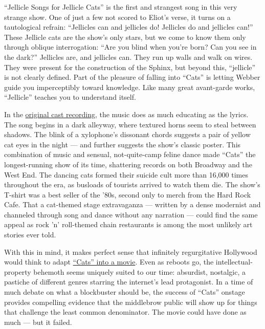 ``Jellicle Songs for Jellicle Cats'' is the first and strangest song in
this very strange show. One of just a few not scored to Eliot's verse,
it turns on a tautological refrain: ``Jellicles can and jellicles do!
Jellicles do and jellicles can!'' These Jellicle cats are the show's
only stars, but we come to know them only through oblique interrogation:
``Are you blind when you're born? Can you see in the dark?'' Jellicles
are, and jellicles can. They run up walls and walk on wires. They were
present for the construction of the Sphinx, but beyond this,
``jellicle'' is not clearly defined. Part of the pleasure of falling
into ``Cats'' is letting Webber guide you imperceptibly toward
knowledge. Like many great avant-garde works, ``Jellicle'' teaches you
to understand itself.

In the \href{https://www.youtube.com/watch?v=GbpP3Sxp-1U}{original cast
recording}, the music does as much educating as the lyrics. The song
begins in a dark alleyway, where textured horns seem to steal between
shadows. The blink of a xylophone's dissonant chords suggests a pair of
yellow cat eyes in the night --- and further suggests the show's classic
poster. This combination of music and sensual, not-quite-camp feline
dance made ``Cats'' the longest-running show of its time, shattering
records on both Broadway and the West End. The dancing cats formed their
suicide cult more than 16,000 times throughout the era, as busloads of
tourists arrived to watch them die. The show's T-shirt was a best seller
of the '80s, second only to merch from the Hard Rock Cafe. That a
cat-themed stage extravaganza --- written by a dense modernist and
channeled through song and dance without any narration --- could find
the same appeal as rock 'n' roll-themed chain restaurants is among the
most unlikely art stories ever told.

With this in mind, it makes perfect sense that infinitely regurgitative
Hollywood would think to adapt
\href{https://www.nytimes3xbfgragh.onion/2019/12/18/movies/cats-review.html}{``Cats''
into a movie}. Even as reboots go, the intellectual-property behemoth
seems uniquely suited to our time: absurdist, nostalgic, a pastiche of
different genres starring the internet's lead protagonist. In a time of
much debate on what a blockbuster should be, the success of ``Cats''
onstage provides compelling evidence that the middlebrow public will
show up for things that challenge the least common denominator. The
movie could have done as much --- but it failed.


